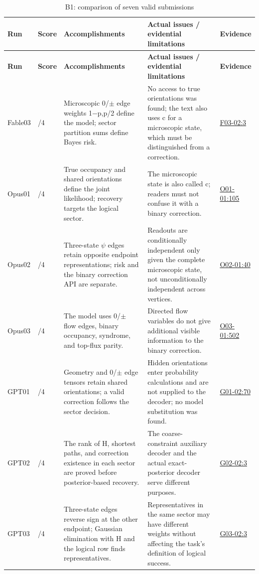 \documentclass[11pt,a4paper]{article}
\begin{document}
{\fontsize{9.0}{12.6}\selectfont
\setlength{\tabcolsep}{2.5pt}
\begin{longtable}{>{\raggedright\arraybackslash}p{}>{\raggedright\arraybackslash}p{}>{\raggedright\arraybackslash}p{}>{\raggedright\arraybackslash}p{}>{\raggedright\arraybackslash}p{}}
\caption{B1: comparison of seven valid submissions}\\
\toprule
\textbf{Run} & \textbf{Score} & \textbf{Accomplishments} & \textbf{Actual issues /\allowbreak{} evidential limitations} & \textbf{Evidence}\tabularnewline
\midrule
\endfirsthead
\toprule
\textbf{Run} & \textbf{Score} & \textbf{Accomplishments} & \textbf{Actual issues /\allowbreak{} evidential limitations} & \textbf{Evidence}\tabularnewline
\midrule
\endhead
{}Fable03 & 4/\allowbreak{}4 & Microscopic 0/\allowbreak{}\ensuremath{\pm} edge weights 1\ensuremath{-}p,\allowbreak{}p/\allowbreak{}2 define the model; sector partition sums define Bayes risk. & No access to true orientations was found; the text also uses c for a microscopic state,\allowbreak{} which must be distinguished from a correction. & \hyperref[src:F03-02]{F03-02:3}\tabularnewline
{}Opus01 & 4/\allowbreak{}4 & True occupancy and shared orientations define the joint likelihood; recovery targets the logical sector. & The microscopic state is also called c; readers must not confuse it with a binary correction. & \hyperref[src:O01-01]{O01-01:105}\tabularnewline
{}Opus02 & 4/\allowbreak{}4 & Three-state \ensuremath{\psi} edges retain opposite endpoint representations; risk and the binary correction API are separate. & Readouts are conditionally independent only given the complete microscopic state,\allowbreak{} not unconditionally independent across vertices. & \hyperref[src:O02-01]{O02-01:40}\tabularnewline
{}Opus03 & 4/\allowbreak{}4 & The model uses 0/\allowbreak{}\ensuremath{\pm} flow edges,\allowbreak{} binary occupancy,\allowbreak{} syndrome,\allowbreak{} and top-flux parity. & Directed flow variables do not give additional visible information to the binary correction. & \hyperref[src:O03-01]{O03-01:502}\tabularnewline
{}GPT01 & 4/\allowbreak{}4 & Geometry and 0/\allowbreak{}\ensuremath{\pm} edge tensors retain shared orientations; a valid correction follows the sector decision. & Hidden orientations enter probability calculations and are not supplied to the decoder; no model substitution was found. & \hyperref[src:G01-02]{G01-02:70}\tabularnewline
{}GPT02 & 4/\allowbreak{}4 & The rank of H,\allowbreak{} shortest paths,\allowbreak{} and correction existence in each sector are proved before posterior-based recovery. & The coarse-constraint auxiliary decoder and the actual exact-posterior decoder serve different purposes. & \hyperref[src:G02-02]{G02-02:3}\tabularnewline
{}GPT03 & 4/\allowbreak{}4 & Three-state edges reverse sign at the other endpoint; Gaussian elimination with H and the logical row finds representatives. & Representatives in the same sector may have different weights without affecting the task’s definition of logical success. & \hyperref[src:G03-02]{G03-02:3}\tabularnewline
\bottomrule
\end{longtable}
}
\end{document}
